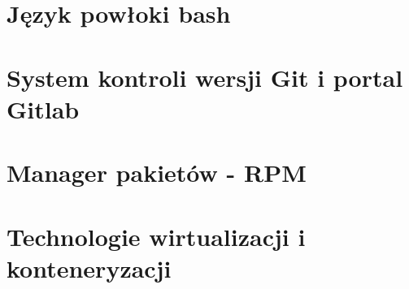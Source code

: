 \section{Język powłoki bash}
\section{System kontroli wersji Git i portal Gitlab}
\section{Manager pakietów - RPM}
\section{Technologie wirtualizacji i konteneryzacji}
